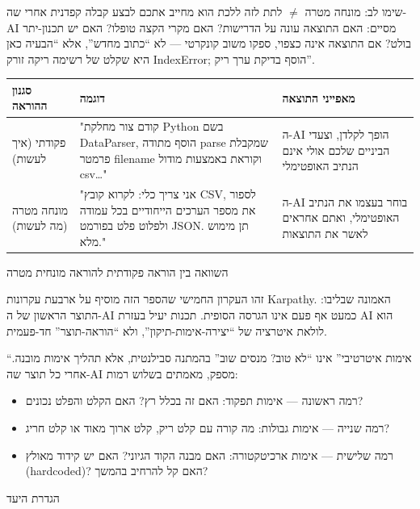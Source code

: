 \begin{tcbwarn}{שימו לב: מונחה מטרה $\neq$ לתת לזה ללכת}
הוא מחייב אתכם לבצע קבלה קפדנית אחרי שה-AI מסיים: האם התוצאה עונה על הדרישות? האם מקרי הקצה טופלו? האם יש תכנון-יתר בולט? אם התוצאה אינה כצפוי, ספקו משוב קונקרטי — לא “כתוב מחדש”, אלא “הבעיה כאן היא שקלט של רשימה ריקה זורק IndexError; הוסף בדיקת ערך ריק”.

\end{tcbwarn}

\begin{center}
\begin{tabularx}{\linewidth}{|X|X|X|}
\hline
\textbf{סגנון ההוראה} & \textbf{דוגמה} & \textbf{מאפייני התוצאה} \tabularnewline
\hline
פקודתי (איך לעשות) & "קודם צור מחלקת Python בשם DataParser, הוסף מתודה parse שמקבלת פרמטר filename וקוראת באמצעות מודול csv…" & ה-AI הופך לקלדן, וצעדי הביניים שלכם אולי אינם הנתיב האופטימלי \tabularnewline
מונחה מטרה (מה לעשות) & "אני צריך כלי: לקרוא קובץ CSV, לספור את מספר הערכים הייחודיים בכל עמודה ולפלוט פלט בפורמט JSON. תן מימוש מלא." & ה-AI בוחר בעצמו את הנתיב האופטימלי, ואתם אחראים לאשר את התוצאות \tabularnewline
\hline
\end{tabularx}
\end{center}

\begin{center}\small\color{gray}השוואה בין הוראה פקודתית להוראה מונחית מטרה\end{center}


זהו העקרון החמישי שהספר הזה מוסיף על ארבעת עקרונות Karpathy. האמונה שבליבו: התוצר הראשון של ה-AI כמעט אף פעם אינו הגרסה הסופית. תכנות יעיל בעזרת AI הוא לולאת איטרציה של “יצירה-אימות-תיקון”, ולא “הוראה-תוצר” חד-פעמית.

“אימות איטרטיבי” אינו “לא טוב? מנסים שוב” בהמתנה סבילנטית, אלא תהליך אימות מובנה. אחרי כל תוצר שה-AI מספק, מאמתים בשלוש רמות:

\begin{itemize}
  \item רמה ראשונה — אימות תפקוד: האם זה בכלל רץ? האם הקלט והפלט נכונים?
  \item רמה שנייה — אימות גבולות: מה קורה עם קלט ריק, קלט ארוך מאוד או קלט חריג?
  \item רמה שלישית — אימות ארכיטקטורה: האם מבנה הקוד הגיוני? האם יש קידוד מאולץ (hardcoded)? האם קל להרחיב בהמשך?
\end{itemize}

הגדרת היעד

